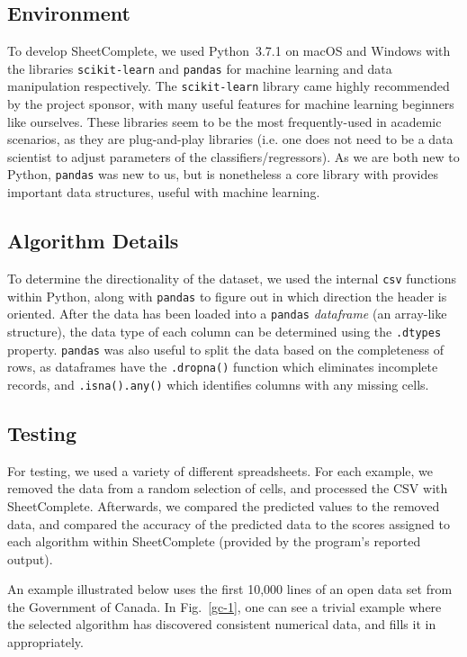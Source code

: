 \documentclass[conference]{IEEEtran}
\begin{document}
\subsection{Environment}
To develop SheetComplete, we used Python~3.7.1 on \mbox{macOS} and Windows with the libraries \texttt{scikit-learn} and \texttt{pandas} for machine learning and data manipulation respectively. The \texttt{scikit-learn} library came highly recommended by the project sponsor, with many useful features for machine learning beginners like ourselves. These libraries seem to be the most frequently-used in academic scenarios, as they are plug-and-play libraries (i.e. one does not need to be a data scientist to adjust parameters of the classifiers/regressors). As we are both new to Python, \texttt{pandas} was new to us, but is nonetheless a core library with provides important data structures, useful with machine learning. 

\subsection{Algorithm Details}
To determine the directionality of the dataset, we used the internal \texttt{csv} functions within Python, along with \texttt{pandas} to figure out in which direction the header is oriented. After the data has been loaded into a \texttt{pandas} \textit{dataframe} (an array-like structure), the data type of each column can be determined using the \texttt{.dtypes} property. \texttt{pandas} was also useful to split the data based on the completeness of rows, as dataframes have the \texttt{.dropna()} function which eliminates incomplete records, and \texttt{.isna().any()} which identifies columns with any missing cells.

\subsection{Testing}
For testing, we used a variety of different spreadsheets. For each example, we removed the data from a random selection of cells, and processed the CSV with SheetComplete. Afterwards, we compared the predicted values to the removed data, and compared the accuracy of the predicted data to the scores assigned to each algorithm within SheetComplete (provided by the program's reported output).

An example illustrated below uses the first 10,000 lines of an open data set \cite{government_of_canada_economics_2018} from the Government of Canada. In Fig.~\ref{gc-1}, one can see a trivial example where the selected algorithm has discovered consistent numerical data, and fills it in appropriately.
\end{document}
